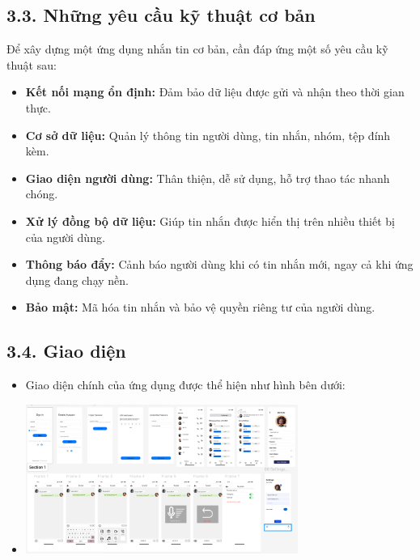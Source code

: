 \documentclass[12pt,a4paper]{article}
\begin{document}
	\vspace{0.7cm}
	
	\subsection*{3.3. Những yêu cầu kỹ thuật cơ bản}
	\vspace{0.1cm}
	
	\noindent
	Để xây dựng một ứng dụng nhắn tin cơ bản, cần đáp ứng một số yêu cầu kỹ thuật sau:
	\begin{itemize}
		\item \textbf{Kết nối mạng ổn định:} Đảm bảo dữ liệu được gửi và nhận theo thời gian thực.
		\item \textbf{Cơ sở dữ liệu:} Quản lý thông tin người dùng, tin nhắn, nhóm, tệp đính kèm.
		\item \textbf{Giao diện người dùng:} Thân thiện, dễ sử dụng, hỗ trợ thao tác nhanh chóng.
		\item \textbf{Xử lý đồng bộ dữ liệu:} Giúp tin nhắn được hiển thị trên nhiều thiết bị của người dùng.
		\item \textbf{Thông báo đẩy:} Cảnh báo người dùng khi có tin nhắn mới, ngay cả khi ứng dụng đang chạy nền.
		\item \textbf{Bảo mật:} Mã hóa tin nhắn và bảo vệ quyền riêng tư của người dùng.
	\end{itemize}
	
	\vspace{0.7cm}
	
	\subsection*{3.4. Giao diện}
	\vspace{0.1cm}
	\begin{itemize}
		\item Giao diện chính của ứng dụng được thể hiện như hình bên dưới:
		\item[]
		\begin{center}
			\includegraphics[width=0.7\textwidth]{giaodien.png}
		\end{center}
	\end{itemize}
\end{document}
